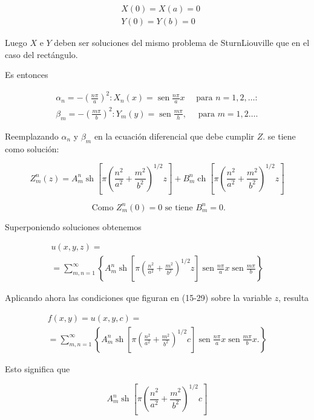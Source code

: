 \documentclass[10pt]{article}
\theoremstyle{plain}
\theoremstyle{definition}
\theoremstyle{remark}
\begin{document}
$$
\begin{aligned}
& X(0)=X(a)=0 \\
& Y(0)=Y(b)=0
\end{aligned}
$$

Luego $X$ e $Y$ deben ser soluciones del mismo problema de SturnLiouville que en el caso del rectángulo.

Es entonces

$$
\begin{array}{ll}
\alpha_{n}=-\left(\frac{n \pi}{a}\right)^{2}: X_{n}(x)=\operatorname{sen} \frac{n \pi}{a} x \quad \text { para } n=1,2, \ldots: \\
\beta_{m}=-\left(\frac{m \pi}{b}\right)^{2}: Y_{m}(y)=\operatorname{sen} \frac{m \pi}{h}, \quad \text { para } m=1,2 \ldots .
\end{array}
$$

Reemplazando $\alpha_{n}$ y $\beta_{m}$ en la ecuación diferencial que debe cumplir $Z$. se tiene como solución:


$$
Z_{m}^{n}(z)=A_{m}^{n} \operatorname{sh}\left[\pi\left(\frac{n^{2}}{a^{2}}+\frac{m^{2}}{b^{2}}\right)^{1 / 2} z\right]+B_{m}^{n} \operatorname{ch}\left[\pi\left(\frac{n^{2}}{a^{2}}+\frac{m^{2}}{b^{2}}\right)^{1 / 2} z\right]
$$

$$
\text { Como } Z_{m}^{n}(0)=0 \text { se tiene } B_{m}^{n}=0 .
$$

Superponiendo soluciones obtenemos


\begin{gather*}
u(x, y, z)= \\
=\sum_{m, n=1}^{\infty}\left\{A_{m}^{n} \operatorname{sh}\left[\pi\left(\frac{n^{2}}{a^{2}}+\frac{m^{2}}{b^{2}}\right)^{1 / 2} z\right] \operatorname{sen} \frac{n \pi}{a} x \operatorname{sen} \frac{m \pi}{b}\right\} \tag{15-30}
\end{gather*}


Aplicando ahora las condiciones que figuran en (15-29) sobre la variable $z$, resulta


\begin{gather*}
f(x, y)=u(x, y, c)= \\
=\sum_{m, n=1}^{\infty}\left\{A_{m}^{n} \operatorname{sh}\left[\pi\left(\frac{n^{2}}{a^{2}}+\frac{m^{2}}{b^{2}}\right)^{1 / 2} c\right] \operatorname{sen} \frac{n \pi}{a} x \operatorname{sen} \frac{m \pi}{b} x .\right\} \tag{15-31}
\end{gather*}


Esto significa que

$$
A_{m}^{n} \operatorname{sh}\left[\pi\left(\frac{n^{2}}{a^{2}}+\frac{m^{2}}{b^{2}}\right)^{1 / 2} c\right]
$$
\end{document}
